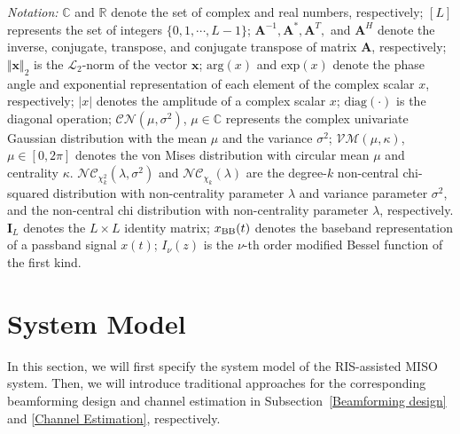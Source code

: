 \documentclass[12pt,draftclsnofoot,journal,onecolumn]{IEEEtran}
\theoremstyle{nonumberplain}
\def \VM {\mathcal{VM}}
\def \nc {\mathcal{NC}}
\begin{document}
\textit{Notation:} $\mathbb C$ and $\mathbb R$ denote the set of complex and real numbers, respectively;
$[L]$ represents the set of integers $\{0,1,\cdots,L-1\}$;
$\bm A^{-1}, \bm A^*,\bm A^T,$ and $\bm A^H$ denote the inverse, conjugate, transpose, and conjugate transpose of matrix $\bm A$, respectively; 
$\Vert \bm x\Vert_{2}$ is the $\mathcal{L}_{2}$-norm of the vector $\bm x$; 
$\text{arg}(x)$ and $\text{exp}(x)$ denote the phase angle and exponential representation of each element of the complex scalar $x$, respectively;
$\vert x\vert$ denotes the amplitude
of a complex scalar $x$; 
$\text{diag}(\cdot )$ is the diagonal operation;
$\mathcal{CN}\left(\mu, \sigma^2 \right)$, $\mu\in \mathbb C$ represents the complex univariate Gaussian distribution with the mean $\mu$ and the variance $\sigma^2$;
$\VM(\mu, \kappa)$, $\mu\in [0,2\pi]$ denotes the von Mises distribution with circular mean $\mu$ and centrality $\kappa$.
$\nc_{\chi_k^2}(\lambda, \sigma^2)$ and $\nc_{\chi_k}(\lambda)$ are the degree-$k$ non-central chi-squared distribution with  non-centrality parameter $\lambda$ and variance parameter $\sigma^2$, and the non-central chi distribution with non-centrality parameter $\lambda$, respectively.   
$\bm I_{L}$ denotes the $L\times L$ identity matrix;
$x_{\rm BB}(t)$ denotes the baseband representation of a passband signal $x(t)$;
$I_\nu(z)$ is the $\nu$-th order modified Bessel function of the first kind. 


\section{System Model}  \label{System Model}
    In this section, we will first specify the system model of the RIS-assisted \ac{MISO} system.
    Then, we will introduce traditional approaches for the corresponding beamforming design and channel estimation in Subsection~\ref{Beamforming design} and \ref{Channel Estimation}, respectively.
\end{document}
